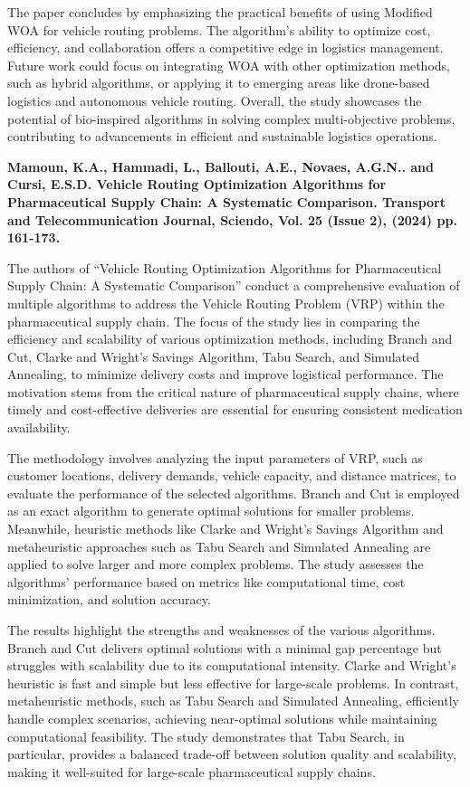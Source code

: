 The paper concludes by emphasizing the practical benefits of using Modified WOA for vehicle routing problems. The algorithm’s ability to optimize cost, efficiency, and collaboration offers a competitive edge in logistics management. Future work could focus on integrating WOA with other optimization methods, such as hybrid algorithms, or applying it to emerging areas like drone-based logistics and autonomous vehicle routing. Overall, the study showcases the potential of bio-inspired algorithms in solving complex multi-objective problems, contributing to advancements in efficient and sustainable logistics operations.

\textbf{\cite{mamoun2024pharmaceutical}Mamoun, K.A., Hammadi, L., Ballouti, A.E., Novaes, A.G.N.. and Cursi, E.S.D. Vehicle Routing Optimization Algorithms for Pharmaceutical Supply Chain: A Systematic Comparison. Transport and Telecommunication Journal, Sciendo, Vol. 25 (Issue 2), (2024) pp. 161-173.}

The authors of “Vehicle Routing Optimization Algorithms for Pharmaceutical Supply Chain: A Systematic Comparison” conduct a comprehensive evaluation of multiple algorithms to address the Vehicle Routing Problem (VRP) within the pharmaceutical supply chain. The focus of the study lies in comparing the efficiency and scalability of various optimization methods, including Branch and Cut, Clarke and Wright's Savings Algorithm, Tabu Search, and Simulated Annealing, to minimize delivery costs and improve logistical performance. The motivation stems from the critical nature of pharmaceutical supply chains, where timely and cost-effective deliveries are essential for ensuring consistent medication availability.

The methodology involves analyzing the input parameters of VRP, such as customer locations, delivery demands, vehicle capacity, and distance matrices, to evaluate the performance of the selected algorithms. Branch and Cut is employed as an exact algorithm to generate optimal solutions for smaller problems. Meanwhile, heuristic methods like Clarke and Wright's Savings Algorithm and metaheuristic approaches such as Tabu Search and Simulated Annealing are applied to solve larger and more complex problems. The study assesses the algorithms' performance based on metrics like computational time, cost minimization, and solution accuracy.

The results highlight the strengths and weaknesses of the various algorithms. Branch and Cut delivers optimal solutions with a minimal gap percentage but struggles with scalability due to its computational intensity. Clarke and Wright's heuristic is fast and simple but less effective for large-scale problems. In contrast, metaheuristic methods, such as Tabu Search and Simulated Annealing, efficiently handle complex scenarios, achieving near-optimal solutions while maintaining computational feasibility. The study demonstrates that Tabu Search, in particular, provides a balanced trade-off between solution quality and scalability, making it well-suited for large-scale pharmaceutical supply chains.

